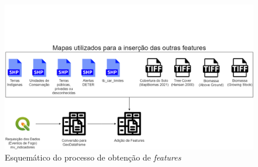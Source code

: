 \begin{figure}[htb]
	\centering
	\begin{minipage}{0.9\linewidth}
		\centering
		\includegraphics[width=\linewidth]{tg1/figuras/esquematico_banco.png}
		\caption{Esquemático do processo de obtenção de \textit{features}} \label{fig:featuresextras}
	\end{minipage}
\end{figure}
